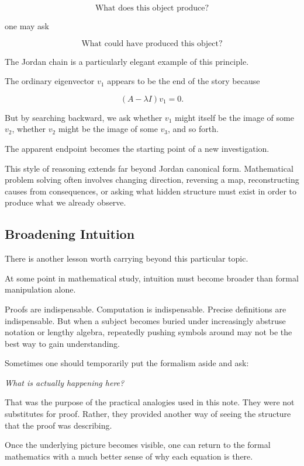 \documentclass[11pt]{article}
\begin{document}
\[
\text{What does this object produce?}
\]

one may ask

\[
\text{What could have produced this object?}
\]

The Jordan chain is a particularly elegant example of this principle.

The ordinary eigenvector \(v_1\) appears to be the end of the story
because

\[
(A-\lambda I)v_1=0.
\]

But by searching backward, we ask whether \(v_1\) might itself be the
image of some \(v_2\), whether \(v_2\) might be the image of some
\(v_3\), and so forth.

The apparent endpoint becomes the starting point of a new
investigation.

This style of reasoning extends far beyond Jordan canonical form.
Mathematical problem solving often involves changing direction,
reversing a map, reconstructing causes from consequences, or asking
what hidden structure must exist in order to produce what we already
observe.


\subsection*{Broadening Intuition}

There is another lesson worth carrying beyond this particular topic.

At some point in mathematical study, intuition must become broader
than formal manipulation alone.

Proofs are indispensable.  Computation is indispensable.  Precise
definitions are indispensable.  But when a subject becomes buried
under increasingly abstruse notation or lengthy algebra, repeatedly
pushing symbols around may not be the best way to gain understanding.

Sometimes one should temporarily put the formalism aside and ask:

\begin{center}
\emph{What is actually happening here?}
\end{center}

That was the purpose of the practical analogies used in this note.
They were not substitutes for proof.  Rather, they provided another
way of seeing the structure that the proof was describing.

Once the underlying picture becomes visible, one can return to the
formal mathematics with a much better sense of why each equation is
there.
\end{document}
